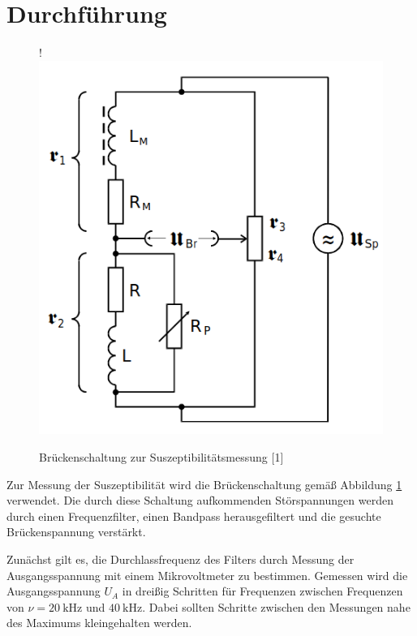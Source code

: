 \section{Durchführung}
\label{sec:Durchführung}

\begin{figure} [H]!
    \centering
    \includegraphics[scale=0.5]{content/bild1.png}
    \caption{Brückenschaltung zur Suszeptibilitätsmessung [1]}
    \label{fig:plot1}
  \end{figure}

Zur Messung der Suszeptibilität wird die Brückenschaltung
gemäß Abbildung \ref{fig:plot1} verwendet. Die durch diese Schaltung
aufkommenden Störspannungen werden durch einen Frequenzfilter,
einen Bandpass herausgefiltert und die gesuchte
Brückenspannung verstärkt.

Zunächst gilt es,
die Durchlassfrequenz des Filters durch Messung der
Ausgangsspannung mit einem Mikrovoltmeter zu bestimmen.
Gemessen wird die Ausgangsspannung $U_A$ in dreißig Schritten
für Frequenzen zwischen Frequenzen von $\nu = \SI{20}{\kilo\hertz}$ und
$\SI{40}{\kilo\hertz}$. Dabei sollten Schritte zwischen den Messungen
nahe des Maximums kleingehalten werden.

